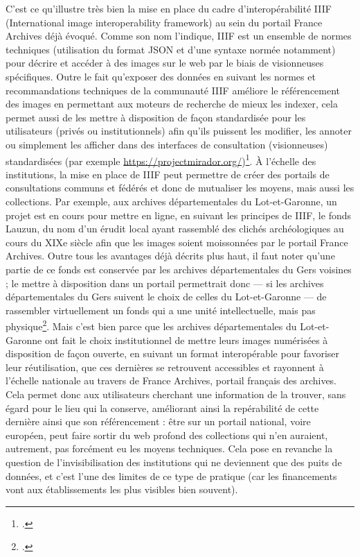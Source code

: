 C’est ce qu’illustre très bien la mise en place du cadre d’interopérabilité IIIF (International image interoperability framework) au sein du portail France Archives déjà évoqué. Comme son nom l’indique, IIIF est un ensemble de normes techniques (utilisation du format JSON et d’une syntaxe normée notamment) pour décrire et accéder à des images sur le web par le biais de visionneuses spécifiques. Outre le fait qu’exposer des données en suivant les normes et recommandations techniques de la communauté IIIF améliore le référencement des images en permettant aux moteurs de recherche de mieux les indexer, cela permet aussi de les mettre à disposition de façon standardisée pour les utilisateurs (privés ou institutionnels) afin qu’ils puissent les modifier, les annoter ou simplement les afficher dans des interfaces de consultation (visionneuses) standardisées (par exemple \url{https://projectmirador.org/})\footcite{robineau_programme_2023}. À l’échelle des institutions, la mise en place de IIIF peut permettre de créer des portails de consultations communs et fédérés et donc de mutualiser les moyens, mais aussi les collections. Par exemple, aux archives départementales du Lot-et-Garonne, un projet est en cours pour mettre en ligne, en suivant les principes de IIIF, le fonds Lauzun, du nom d’un érudit local ayant rassemblé des clichés archéologiques au cours du XIXe siècle afin que les images soient moissonnées par le portail France Archives. Outre tous les avantages déjà décrits plus haut, il faut noter qu’une partie de ce fonds est conservée par les archives départementales du Gers voisines ; le mettre à disposition dans un portail permettrait donc — si les archives départementales du Gers suivent le choix de celles du Lot-et-Garonne — de rassembler virtuellement un fonds qui a une unité intellectuelle, mais pas physique\footcite{brunet_archives_2023}. Mais c’est bien parce que les archives départementales du Lot-et-Garonne ont fait le choix institutionnel de mettre leurs images numérisées à disposition de façon ouverte, en suivant un format interopérable pour favoriser leur réutilisation, que ces dernières se retrouvent accessibles et rayonnent à l’échelle nationale au travers de France Archives, portail français des archives. Cela permet donc aux utilisateurs cherchant une information de la trouver, sans égard pour le lieu qui la conserve, améliorant ainsi la repérabilité de cette dernière ainsi que son référencement : être sur un portail national, voire européen, peut faire sortir du web profond des collections qui n’en auraient, autrement, pas forcément eu les moyens techniques. Cela pose en revanche la question de l’invisibilisation des institutions qui ne deviennent que des puits de données, et c’est l’une des limites de ce type de pratique (car les financements vont aux établissements les plus visibles bien souvent).

